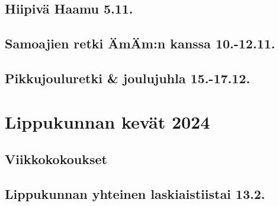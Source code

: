 \documentclass[10pt,finnish,a5paper,headings=small,twoside=semi]{scrartcl}
\begin{document}
	\subsection{Hiipivä Haamu 5.11.}
	\subsection{Samoajien retki ÄmÄm:n kanssa 10.-12.11.}
	\subsection{Pikkujouluretki \& joulujuhla 15.-17.12.}

\clearpage\section{Lippukunnan kevät 2024}
	\subsection{Viikkokokoukset}
	\subsection{Lippukunnan yhteinen laskiaistiistai 13.2.}
\end{document}
